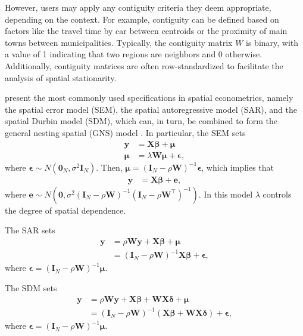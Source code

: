 However, users may apply any contiguity criteria they deem appropriate, depending on the context. For example, contiguity can be defined based on factors like the travel time by car between centroids or the proximity of main towns between municipalities. Typically, the contiguity matrix \( W \) is binary, with a value of 1 indicating that two regions are neighbors and 0 otherwise. Additionally, contiguity matrices are often row-standardized to facilitate the analysis of spatial stationarity.

\cite{lesage2009introduction,bivand2015spatial} present the most commonly used specifications in spatial econometrics, namely the spatial error model (SEM), the spatial autoregressive model (SAR), and the spatial Durbin model (SDM), which can, in turn, be combined to form the general nesting spatial (GNS) model \cite{elhorst2014spatial,Ramirez2017}. In particular, the SEM sets
\begin{align*}
	\boldsymbol{y} &= \boldsymbol{X\beta} + \boldsymbol{\mu}\\
	\boldsymbol{\mu} &= \lambda\boldsymbol{W\mu} + \boldsymbol{\epsilon},
\end{align*}
where $\boldsymbol{\epsilon}\sim N(\boldsymbol{0}_N,\sigma^2\boldsymbol{I}_N)$. Then, $\boldsymbol{\mu}=(\boldsymbol{I}_N-\rho\boldsymbol{W})^{-1}\boldsymbol{\epsilon}$, which implies that 
\begin{align*}
	\boldsymbol{y} &= \boldsymbol{X\beta} + \boldsymbol{e},
\end{align*}
where $\boldsymbol{e}\sim N(\boldsymbol{0},\sigma^2(\boldsymbol{I}_N-\rho\boldsymbol{W})^{-1}(\boldsymbol{I}_N-\rho\boldsymbol{W}^{\top})^{-1})$. In this model $\lambda$ controls the degree of spatial dependence. 

The SAR sets
\begin{align*}
	\boldsymbol{y} &= \rho\boldsymbol{Wy} + \boldsymbol{X\beta} + \boldsymbol{\mu}\\
	 &= (\boldsymbol{I}_N-\rho\boldsymbol{W})^{-1}\boldsymbol{X\beta} + \boldsymbol{\epsilon},
\end{align*}
where $\boldsymbol{\epsilon}=(\boldsymbol{I}_N-\rho\boldsymbol{W})^{-1}\boldsymbol{\mu}$.

The SDM sets
\begin{align*}
	\boldsymbol{y} &= \rho\boldsymbol{Wy} + \boldsymbol{X\beta} +  \boldsymbol{WX\delta} + \boldsymbol{\mu}\\
	&= (\boldsymbol{I}_N-\rho\boldsymbol{W})^{-1}(\boldsymbol{X\beta} +  \boldsymbol{WX\delta}) + \boldsymbol{\epsilon},
\end{align*}
where $\boldsymbol{\epsilon}=(\boldsymbol{I}_N-\rho\boldsymbol{W})^{-1}\boldsymbol{\mu}$.

